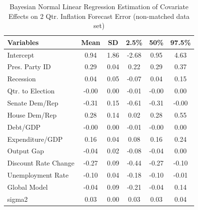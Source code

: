 \documentclass[a4paper]{article}\usepackage{graphicx, color}
\begin{document}
\begin{table}[ht]
\begin{center}
\caption{Bayesian Normal Linear Regression Estimation of Covariate Effects on 2 Qtr. Inflation Forecast Error (non-matched data set)}
\label{OutputNB}
{\small
\begin{tabular}{lccccc}
  \hline
Variables & Mean & SD & 2.5\% & 50\% & 97.5\% \\ 
  \hline
Intercept & 0.94 & 1.86 & -2.68 & 0.95 & 4.63 \\ 
  Pres. Party ID & 0.29 & 0.04 & 0.22 & 0.29 & 0.37 \\ 
  Recession & 0.04 & 0.05 & -0.07 & 0.04 & 0.15 \\ 
  Qtr. to Election & -0.00 & 0.00 & -0.01 & -0.00 & 0.00 \\ 
  Senate Dem/Rep & -0.31 & 0.15 & -0.61 & -0.31 & -0.00 \\ 
  House Dem/Rep & 0.28 & 0.14 & 0.02 & 0.28 & 0.55 \\ 
  Debt/GDP & -0.00 & 0.00 & -0.01 & -0.00 & 0.00 \\ 
  Expenditure/GDP & 0.16 & 0.04 & 0.08 & 0.16 & 0.24 \\ 
  Output Gap & -0.04 & 0.02 & -0.08 & -0.04 & 0.00 \\ 
  Discount Rate Change & -0.27 & 0.09 & -0.44 & -0.27 & -0.10 \\ 
  Unemployment Rate & -0.10 & 0.04 & -0.18 & -0.10 & -0.01 \\ 
  Global Model & -0.04 & 0.09 & -0.21 & -0.04 & 0.14 \\ 
  sigma2 & 0.03 & 0.00 & 0.03 & 0.03 & 0.04 \\ 
   \hline
\end{tabular}
}
\end{center}
\end{table}





\end{document}
